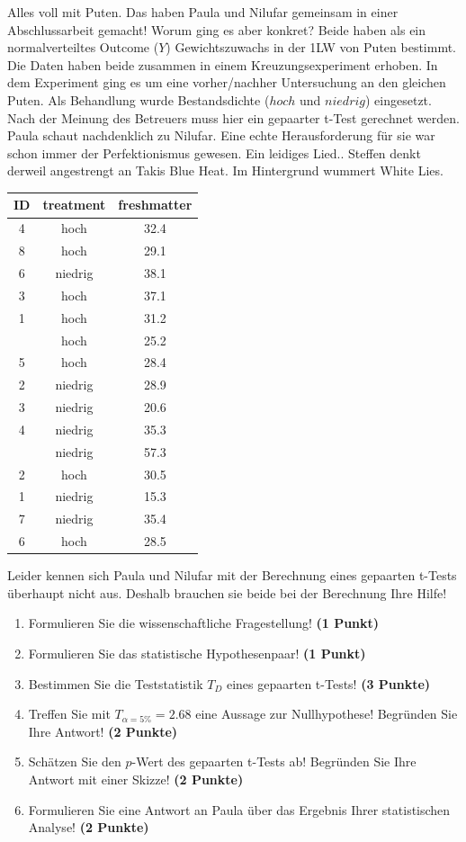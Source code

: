 \documentclass[a4paper, 9pt]{scrartcl}\usepackage[]{graphicx}\usepackage[]{xcolor}
\begin{document}
Alles voll mit Puten. Das haben Paula und Nilufar gemeinsam in einer Abschlussarbeit gemacht! Worum ging es aber konkret? Beide haben als ein normalverteiltes Outcome ($Y$) Gewichtszuwachs in der 1LW von Puten bestimmt. Die Daten haben beide zusammen in einem Kreuzungsexperiment erhoben. In dem Experiment ging es um eine vorher/nachher Untersuchung an den gleichen Puten. Als Behandlung wurde Bestandsdichte ($hoch$ und $niedrig$) eingesetzt. Nach der Meinung des Betreuers muss hier ein gepaarter t-Test gerechnet werden. Paula schaut nachdenklich zu Nilufar. Eine echte Herausforderung für sie war schon immer der Perfektionismus gewesen. Ein leidiges Lied.. Steffen denkt derweil angestrengt an Takis Blue Heat. Im Hintergrund wummert White Lies.

\begin{table}[!h]
\centering
\begin{tabular}{ccc}
\toprule
ID & treatment & freshmatter\\
\midrule
4 & hoch & 32.4\\
8 & hoch & 29.1\\
6 & niedrig & 38.1\\
3 & hoch & 37.1\\
1 & hoch & 31.2\\
\addlinespace
7 & hoch & 25.2\\
5 & hoch & 28.4\\
2 & niedrig & 28.9\\
3 & niedrig & 20.6\\
4 & niedrig & 35.3\\
\addlinespace
5 & niedrig & 57.3\\
2 & hoch & 30.5\\
1 & niedrig & 15.3\\
7 & niedrig & 35.4\\
6 & hoch & 28.5\\
\bottomrule
\end{tabular}
\end{table}



Leider kennen sich Paula und Nilufar mit der Berechnung eines gepaarten t-Tests überhaupt nicht aus. Deshalb brauchen sie beide bei der Berechnung Ihre Hilfe!

\begin{enumerate}
  \item Formulieren Sie die wissenschaftliche Fragestellung! \textbf{(1 Punkt)}
  \item Formulieren Sie das statistische Hypothesenpaar! \textbf{(1 Punkt)}
  \item Bestimmen Sie die Teststatistik $T_{D}$ eines gepaarten t-Tests! \textbf{(3 Punkte)}
  \item Treffen Sie mit $T_{\alpha = 5\%} = 2.68$ eine Aussage zur Nullhypothese! Begründen Sie Ihre Antwort! \textbf{(2 Punkte)}
\item Schätzen Sie den $p$-Wert des gepaarten t-Tests ab! Begründen Sie Ihre Antwort mit einer Skizze! \textbf{(2 Punkte)}
\item Formulieren Sie eine Antwort an Paula über das Ergebnis Ihrer statistischen Analyse! \textbf{(2 Punkte)}
\end{enumerate}
\end{document}
